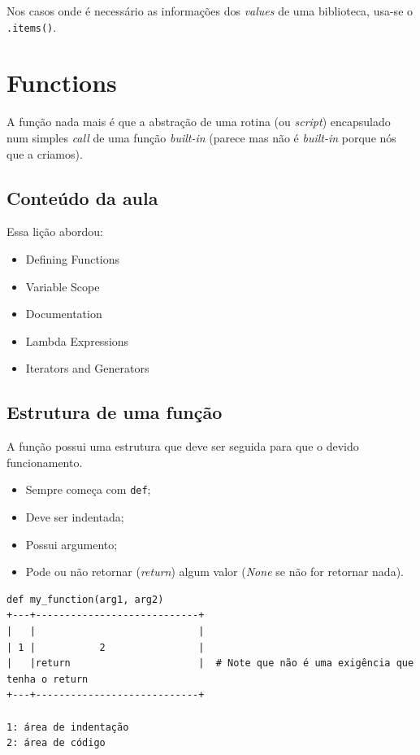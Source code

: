 \documentclass[]{book}
\providecommand{\tightlist}{%
  \setlength{\itemsep}{0pt}\setlength{\parskip}{0pt}}
\begin{document}
Nos casos onde é necessário as informações dos \emph{values} de uma
biblioteca, usa-se o \texttt{.items()}.

\section{Functions}\label{functions}

A função nada mais é que a abstração de uma rotina (ou \emph{script})
encapsulado num simples \emph{call} de uma função \emph{built-in}
(parece mas não é \emph{built-in} porque nós que a criamos).

\subsection{Conteúdo da aula}\label{conteudo-da-aula}

Essa lição abordou:

\begin{itemize}
\tightlist
\item
  Defining Functions
\item
  Variable Scope
\item
  Documentation
\item
  Lambda Expressions
\item
  Iterators and Generators
\end{itemize}

\subsection{Estrutura de uma função}\label{estrutura-de-uma-funcao}

A função possui uma estrutura que deve ser seguida para que o devido
funcionamento.

\begin{itemize}
\tightlist
\item
  Sempre começa com \texttt{def};
\item
  Deve ser indentada;
\item
  Possui argumento;
\item
  Pode ou não retornar (\emph{return}) algum valor (\emph{None} se não
  for retornar nada).
\end{itemize}

\begin{verbatim}
def my_function(arg1, arg2)
+---+----------------------------+
|   |                            |
| 1 |           2                |
|   |return                      |  # Note que não é uma exigência que tenha o return
+---+----------------------------+

1: área de indentação
2: área de código
\end{verbatim}
\end{document}
